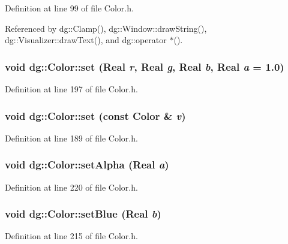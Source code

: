Definition at line 99 of file Color.h.

Referenced by dg::Clamp(), dg::Window::draw\-String(), dg::Visualizer::draw\-Text(), and dg::operator $\ast$().
\subsubsection{\setlength{\rightskip}{0pt plus 5cm}void dg::Color::set ({\bf Real} {\em r}, {\bf Real} {\em g}, {\bf Real} {\em b}, {\bf Real} {\em a} = 1.0)\hspace{0.3cm}{\tt  [inline]}}\label{classdg_1_1Color_a19}




Definition at line 197 of file Color.h.
\subsubsection{\setlength{\rightskip}{0pt plus 5cm}void dg::Color::set (const Color \& {\em v})\hspace{0.3cm}{\tt  [inline]}}\label{classdg_1_1Color_a18}




Definition at line 189 of file Color.h.
\subsubsection{\setlength{\rightskip}{0pt plus 5cm}void dg::Color::set\-Alpha ({\bf Real} {\em a})\hspace{0.3cm}{\tt  [inline]}}\label{classdg_1_1Color_a23}




Definition at line 220 of file Color.h.
\subsubsection{\setlength{\rightskip}{0pt plus 5cm}void dg::Color::set\-Blue ({\bf Real} {\em b})\hspace{0.3cm}{\tt  [inline]}}\label{classdg_1_1Color_a22}




Definition at line 215 of file Color.h.
